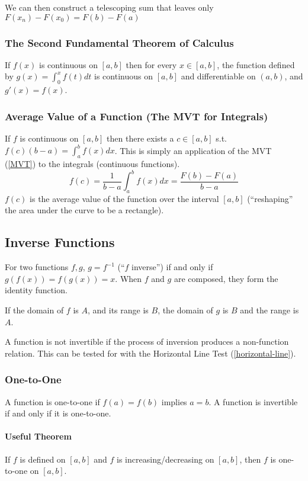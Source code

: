 \documentclass{article}
\begin{document}
We can then construct a telescoping sum that leaves only $F(x_n)-F(x_0)=F(b)-F(a)$

\subsubsection{The Second Fundamental Theorem of Calculus}
If $f(x)$ is continuous on $[a,b]$ then for every $x\in[a,b]$, the function defined by $g(x)=\int_0^xf(t)dt$ is continuous on $[a,b]$ and differentiable on $(a,b)$, and $g'(x)=f(x)$.

\subsubsection{Average Value of a Function (The MVT for Integrals)}
If $f$ is continuous on $[a,b]$ then there exists a $c\in[a,b]$ s.t. $f(c)(b-a)=\int_a^bf(x)dx$. This is simply an application of the MVT (\ref{MVT}) to the integrals (continuous functions).
$$f(c) = \frac{1}{b-a}\int_a^bf(x)dx=\frac{F(b)-F(a)}{b-a}$$
$f(c)$ is the average value of the function over the interval $[a,b]$ (``reshaping'' the area under the curve to be a rectangle).

\subsection{Inverse Functions}
For two functions $f,g$, $g=f^{-1}$ (``$f$ inverse'') if and only if $g(f(x)) = f(g(x)) = x$. When $f$ and $g$ are composed, they form the identity function.

If the domain of $f$ is $A$, and its range is $B$, the domain of $g$ is $B$ and the range is $A$.

A function is not invertible if the process of inversion produces a non-function relation. This can be tested for with the Horizontal Line Test (\ref{horizontal-line}).

\subsubsection{One-to-One}
A function is one-to-one if $f(a)=f(b)$ implies $a=b$. A function is invertible if and only if it is one-to-one.

\paragraph{Useful Theorem} If $f$ is defined on $[a,b]$ and $f$ is increasing/decreasing on $[a,b]$, then $f$ is one-to-one on $[a,b]$.
\end{document}
